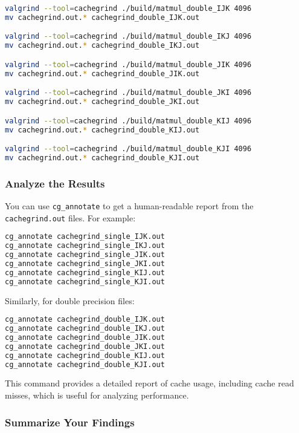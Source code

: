 \documentclass[12pt]{article}
\begin{document}
\begin{lstlisting}[language=bash]
valgrind --tool=cachegrind ./build/matmul_double_IJK 4096
mv cachegrind.out.* cachegrind_double_IJK.out

valgrind --tool=cachegrind ./build/matmul_double_IKJ 4096
mv cachegrind.out.* cachegrind_double_IKJ.out

valgrind --tool=cachegrind ./build/matmul_double_JIK 4096
mv cachegrind.out.* cachegrind_double_JIK.out

valgrind --tool=cachegrind ./build/matmul_double_JKI 4096
mv cachegrind.out.* cachegrind_double_JKI.out

valgrind --tool=cachegrind ./build/matmul_double_KIJ 4096
mv cachegrind.out.* cachegrind_double_KIJ.out

valgrind --tool=cachegrind ./build/matmul_double_KJI 4096
mv cachegrind.out.* cachegrind_double_KJI.out
\end{lstlisting}

\subsubsection{Analyze the Results}

You can use \texttt{cg\_annotate} to get a human-readable report from the \texttt{cachegrind.out} files. For example:

\begin{lstlisting}[language=bash]
cg_annotate cachegrind_single_IJK.out
cg_annotate cachegrind_single_IKJ.out
cg_annotate cachegrind_single_JIK.out
cg_annotate cachegrind_single_JKI.out
cg_annotate cachegrind_single_KIJ.out
cg_annotate cachegrind_single_KJI.out
\end{lstlisting}

Similarly, for double precision files:

\begin{lstlisting}[language=bash]
cg_annotate cachegrind_double_IJK.out
cg_annotate cachegrind_double_IKJ.out
cg_annotate cachegrind_double_JIK.out
cg_annotate cachegrind_double_JKI.out
cg_annotate cachegrind_double_KIJ.out
cg_annotate cachegrind_double_KJI.out
\end{lstlisting}

This command provides a detailed report of cache usage, including cache read misses, which is useful for analyzing performance.

\subsubsection{Summarize Your Findings}
\end{document}
